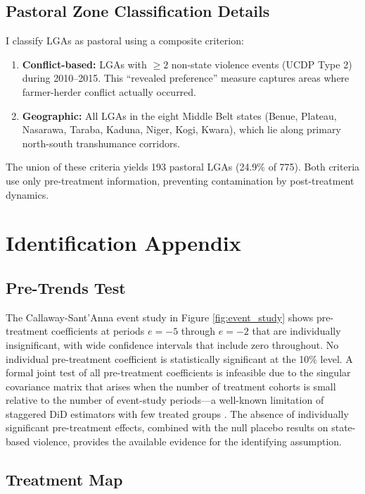 \documentclass[12pt]{article}
\begin{document}


\subsection{Pastoral Zone Classification Details}

I classify LGAs as pastoral using a composite criterion:
\begin{enumerate}
\item \textbf{Conflict-based:} LGAs with $\geq 2$ non-state violence events (UCDP Type 2) during 2010--2015. This ``revealed preference'' measure captures areas where farmer-herder conflict actually occurred.
\item \textbf{Geographic:} All LGAs in the eight Middle Belt states (Benue, Plateau, Nasarawa, Taraba, Kaduna, Niger, Kogi, Kwara), which lie along primary north-south transhumance corridors.
\end{enumerate}

The union of these criteria yields 193 pastoral LGAs (24.9\% of 775). Both criteria use only pre-treatment information, preventing contamination by post-treatment dynamics.

\section{Identification Appendix}

\subsection{Pre-Trends Test}

The Callaway-Sant'Anna event study in Figure \ref{fig:event_study} shows pre-treatment coefficients at periods $e = -5$ through $e = -2$ that are individually insignificant, with wide confidence intervals that include zero throughout. No individual pre-treatment coefficient is statistically significant at the 10\% level. A formal joint test of all pre-treatment coefficients is infeasible due to the singular covariance matrix that arises when the number of treatment cohorts is small relative to the number of event-study periods---a well-known limitation of staggered DiD estimators with few treated groups \citep{roth2023s}. The absence of individually significant pre-treatment effects, combined with the null placebo results on state-based violence, provides the available evidence for the identifying assumption.

\subsection{Treatment Map}
\end{document}
